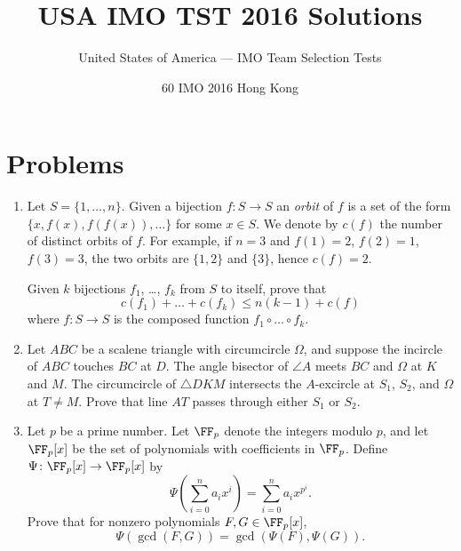 \documentclass[11pt]{scrartcl}
\begin{document}
\title{USA IMO TST 2016 Solutions}
\subtitle{United States of America --- IMO Team Selection Tests}
\date{60 IMO 2016 Hong Kong}

\maketitle

\tableofcontents
\newpage

\addtocounter{section}{-1}
\section{Problems}
\begin{enumerate}[\bfseries 1.]
\item %
Let $S = \{1, \dots, n\}$.
Given a bijection $f \colon S \to S$ an \emph{orbit} of $f$ is a
set of the form $\{x, f(x), f(f(x)), \dots \}$ for some $x \in S$.
We denote by $c(f)$ the number of distinct orbits of $f$.
For example, if $n=3$ and $f(1)=2$, $f(2)=1$, $f(3)=3$,
the two orbits are $\{1,2\}$ and $\{3\}$, hence $c(f)=2$.

Given $k$ bijections $f_1$, \dots, $f_k$ from $S$ to itself, prove that
\[ c(f_1) + \dots + c(f_k) \le n(k-1) + c(f) \]
where $f \colon S \to S$ is the composed function $f_1 \circ \dots \circ f_k$.

\item %
Let $ABC$ be a scalene triangle with circumcircle $\Omega$,
and suppose the incircle of $ABC$ touches $BC$ at $D$.
The angle bisector of $\angle A$ meets $BC$ and $\Omega$ at $K$ and $M$.
The circumcircle of $\triangle DKM$ intersects the $A$-excircle
at $S_1$, $S_2$, and $\Omega$ at $T \neq M$.
Prove that line $AT$ passes through either $S_1$ or $S_2$.

\item %
Let $p$ be a prime number. Let $\FF_p$ denote the integers modulo $p$,
and let $\FF_p[x]$ be the set of polynomials with coefficients in $\FF_p$.
Define $\Psi \colon \FF_p[x] \to \FF_p[x]$ by
\[ \Psi\left( \sum_{i=0}^n a_i x^i \right) = \sum_{i=0}^n a_i x^{p^i}. \]
Prove that for nonzero polynomials $F,G \in \FF_p[x]$,
\[ \Psi(\gcd(F,G)) = \gcd(\Psi(F), \Psi(G)). \]


\end{enumerate}
\end{document}
